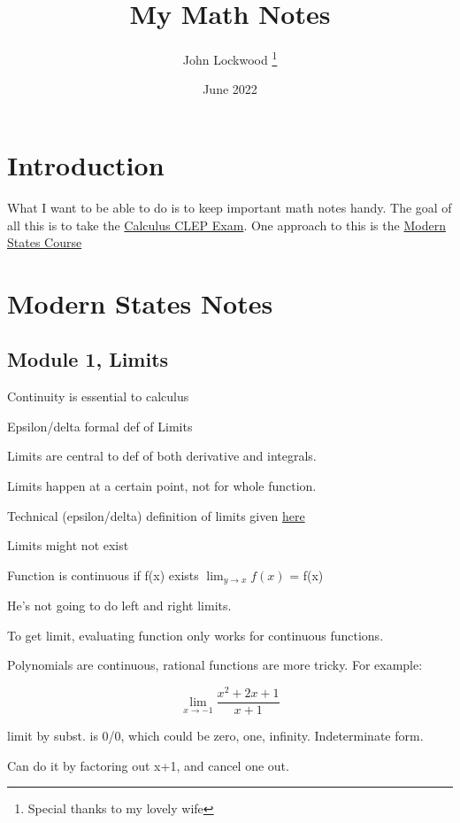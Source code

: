 \documentclass[12pt, letterpaper]{article}
\title{My Math Notes}
\author{John Lockwood \thanks{Special thanks to my lovely wife}}
\date{June 2022}
\begin{document}
\maketitle

\section{Introduction}

What I want to be able to do is to keep important math notes handy.
The goal of all this is to take the \href{https://clep.collegeboard.org/clep-exams/calculus}{Calculus CLEP Exam}.  
One approach to this is the \href{https://courses.modernstates.org/courses/course-v1:ModernStatesX+Calculus+2017/course/}{Modern States Course}
\section{Modern States Notes}
\subsection{Module 1, Limits}

Continuity is essential to calculus

Epsilon/delta formal def of Limits

Limits are central to def of both derivative and integrals.

Limits happen at a certain point, not for whole function.

Technical (epsilon/delta) definition of limits given \href{https://courses.modernstates.org/courses/course-v1:ModernStatesX+Calculus+2017/courseware/8f598eefb77a4cceb9d65d6ae993c417/4c2b909e818e421ba4a9e7aa31aba97f/?child=first}{here}

Limits might not exist

Function is continuous if f(x) exists \(\lim_{y \to x} f(x)\)  = f(x)

He's not going to do left and right limits.

To get limit, evaluating function only works for continuous functions.

Polynomials are continuous, rational functions are more tricky.  For example:

\[
    \lim_{x \to -1}\frac{x^2 + 2x + 1}{x + 1}
\]

limit by subst. is 0/0, which could be zero, one, infinity.  Indeterminate form.

Can do it by factoring out x+1, and cancel one out.
\end{document}

